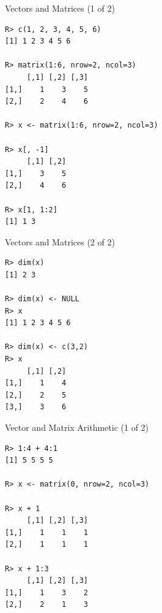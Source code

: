 \begin{frame}
  \begin{exampleblock}{Vectors and Matrices (1 of 2)}\pause
  \begin{lstlisting}[backgroundcolor=\color{white},basicstyle=\ttfamily\color{dkgray}\scriptsize,keywordstyle=\color{black}, 
  commentstyle=\color{orange},stringstyle=\color{mauve}]
R> c(1, 2, 3, 4, 5, 6)
[1] 1 2 3 4 5 6

R> matrix(1:6, nrow=2, ncol=3)
     [,1] [,2] [,3]
[1,]    1    3    5
[2,]    2    4    6

R> x <- matrix(1:6, nrow=2, ncol=3)

R> x[, -1]
     [,1] [,2]
[1,]    3    5
[2,]    4    6

R> x[1, 1:2]
[1] 1 3
\end{lstlisting}
  \end{exampleblock}
\end{frame}


\begin{frame}[fragile]
  \begin{exampleblock}{Vectors and Matrices (2 of 2)}\pause
  \begin{lstlisting}[backgroundcolor=\color{white},basicstyle=\ttfamily\color{dkgray}\scriptsize,keywordstyle=\color{black}, 
  commentstyle=\color{orange},stringstyle=\color{mauve}]
R> dim(x)
[1] 2 3

R> dim(x) <- NULL
R> x
[1] 1 2 3 4 5 6

R> dim(x) <- c(3,2)
R> x
     [,1] [,2]
[1,]    1    4
[2,]    2    5
[3,]    3    6
\end{lstlisting}
  \end{exampleblock}
\end{frame}


\begin{frame}[fragile]
  \begin{exampleblock}{Vector and Matrix Arithmetic (1 of 2)}\pause
  \begin{lstlisting}[backgroundcolor=\color{white},basicstyle=\ttfamily\color{dkgray}\scriptsize,keywordstyle=\color{black}, 
  commentstyle=\color{orange},stringstyle=\color{mauve}]
R> 1:4 + 4:1
[1] 5 5 5 5

R> x <- matrix(0, nrow=2, ncol=3)

R> x + 1
     [,1] [,2] [,3]
[1,]    1    1    1
[2,]    1    1    1

R> x + 1:3
     [,1] [,2] [,3]
[1,]    1    3    2
[2,]    2    1    3

\end{lstlisting} %
  \end{exampleblock}
\end{frame}



